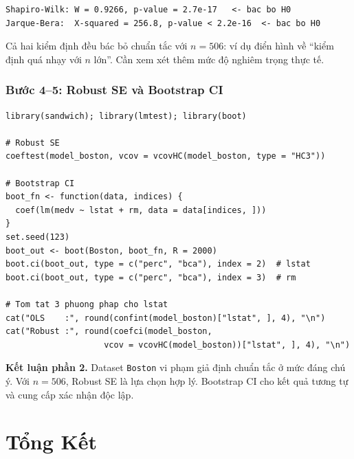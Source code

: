 \documentclass[12pt, a4paper]{article}
\begin{document}
\begin{lstlisting}[style=output]
Shapiro-Wilk: W = 0.9266, p-value = 2.7e-17   <- bac bo H0
Jarque-Bera:  X-squared = 256.8, p-value < 2.2e-16  <- bac bo H0
\end{lstlisting}

Cả hai kiểm định đều bác bỏ chuẩn tắc với $n = 506$: ví dụ điển hình về ``kiểm định quá nhạy với $n$ lớn''. Cần xem xét thêm mức độ nghiêm trọng thực tế.

\subsubsection*{Bước 4--5: Robust SE và Bootstrap CI}

\begin{lstlisting}[style=Rstyle]
library(sandwich); library(lmtest); library(boot)

# Robust SE
coeftest(model_boston, vcov = vcovHC(model_boston, type = "HC3"))

# Bootstrap CI
boot_fn <- function(data, indices) {
  coef(lm(medv ~ lstat + rm, data = data[indices, ]))
}
set.seed(123)
boot_out <- boot(Boston, boot_fn, R = 2000)
boot.ci(boot_out, type = c("perc", "bca"), index = 2)  # lstat
boot.ci(boot_out, type = c("perc", "bca"), index = 3)  # rm

# Tom tat 3 phuong phap cho lstat
cat("OLS    :", round(confint(model_boston)["lstat", ], 4), "\n")
cat("Robust :", round(coefci(model_boston,
                    vcov = vcovHC(model_boston))["lstat", ], 4), "\n")
\end{lstlisting}

\textbf{Kết luận phần 2.} Dataset \texttt{Boston} vi phạm giả định chuẩn tắc ở mức đáng chú ý. Với $n = 506$, Robust SE là lựa chọn hợp lý. Bootstrap CI cho kết quả tương tự và cung cấp xác nhận độc lập.

\section*{Tổng Kết}
\end{document}
